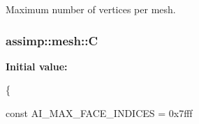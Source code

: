 Maximum number of vertices per mesh. \hypertarget{namespaceassimp_1_1mesh_a1b9baecc5d02a553b4821435ce09e077}{
\subsubsection[{C}]{\setlength{\rightskip}{0pt plus 5cm}assimp\+::mesh\+::\+C}}\label{namespaceassimp_1_1mesh_a1b9baecc5d02a553b4821435ce09e077}
{\bfseries Initial value\+:}
\begin{DoxyCode}
\{
   

   
   \textcolor{keyword}{const} AI\_MAX\_FACE\_INDICES = 0x7fff
\end{DoxyCode}
